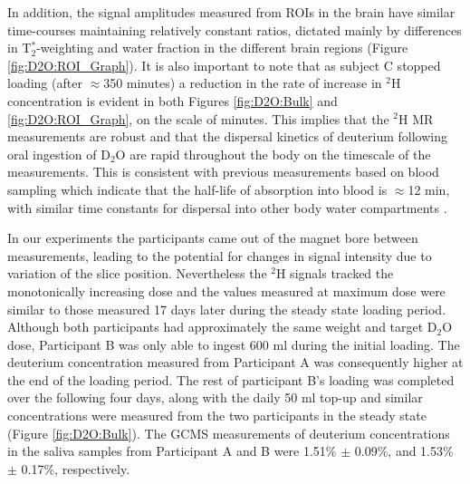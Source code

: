 \documentclass[class=article, crop=false]{standalone}
\begin{document}
In addition, the signal amplitudes measured from ROIs in the brain have similar time-courses maintaining relatively constant ratios, dictated mainly by differences in T$_2^*$-weighting and water fraction in the different brain regions (Figure \ref{fig:D2O:ROI_Graph}). It is also important to note that as subject C stopped loading (after $\approx$350 minutes) a reduction in the rate of increase in $^2$H concentration is evident in both Figures \ref{fig:D2O:Bulk} and \ref{fig:D2O:ROI_Graph}, on the scale of minutes. This implies that the $^2$H MR measurements are robust and that the dispersal kinetics of deuterium following oral ingestion of D$_2$O are rapid throughout the body on the timescale of the measurements. This is consistent with previous measurements based on blood sampling which indicate that the half-life of absorption into blood is $\approx$12 min, with similar time constants for dispersal into other body water compartments \cite{Davies2001RapidWater,Peronnet2012PharmacokineticHumans}. 

In our experiments the participants came out of the magnet bore between measurements, leading to the potential for changes in signal intensity due to variation of the slice position. Nevertheless the $^2$H signals tracked the monotonically increasing dose and the values measured at maximum dose were similar to those measured 17 days later during the steady state loading period. Although both participants had approximately the same weight and target D$_2$O dose, Participant B was only able to ingest 600 ml during the initial loading. The deuterium concentration measured from Participant A was consequently higher at the end of the loading period. The rest of participant B’s loading was completed over the following four days, along with the daily 50 ml top-up and similar concentrations were measured from the two participants in the steady state (Figure \ref{fig:D2O:Bulk}). The GCMS measurements of deuterium concentrations in the saliva samples from Participant A and B were 1.51\% $\pm$ 0.09\%, and 1.53\% $\pm$ 0.17\%, respectively. 
\end{document}
